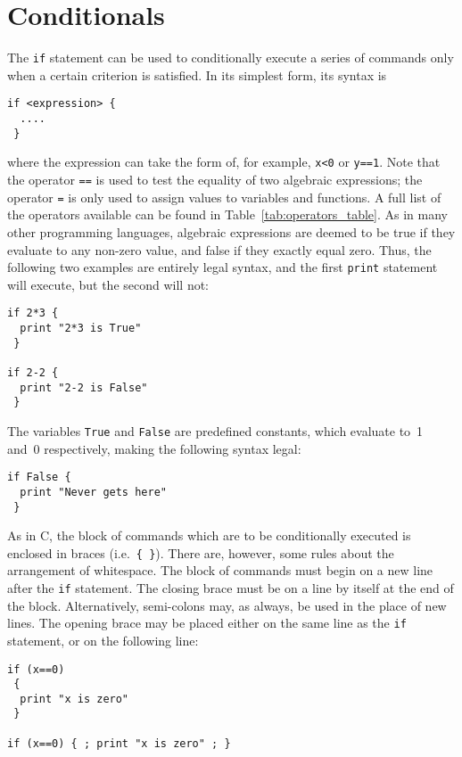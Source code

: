 \section{Conditionals}

The {\tt if} statement can be used to conditionally execute a series
of commands only when a certain criterion is satisfied. In its simplest form,
its syntax is

\begin{verbatim}
if <expression> {
  ....
 }
\end{verbatim}

\noindent where the expression can take the form of, for example, {\tt x<0} or
{\tt y==1}. Note that the operator {\tt ==} is used to test the equality of two
algebraic expressions; the operator {\tt =} is only used to assign values to
variables and functions. A full list of the operators available can be found in
Table~\ref{tab:operators_table}. As in many other programming languages,
algebraic expressions are deemed to be true if they evaluate to any non-zero
value, and false if they exactly equal zero. Thus, the following two examples
are entirely legal syntax, and the first {\tt print} statement will execute,
but the second will not:

\begin{verbatim}
if 2*3 {
  print "2*3 is True"
 }

if 2-2 {
  print "2-2 is False"
 }
\end{verbatim}

\noindent The variables {\tt True} and {\tt False} are predefined constants,
which evaluate to~1 and~0 respectively, making the following syntax legal:

\begin{verbatim}
if False {
  print "Never gets here"
 }
\end{verbatim}

As in C, the block of commands which are to be conditionally executed is
enclosed in braces (i.e.\ {\tt \{~\}}).  There are, however, some rules about
the arrangement of whitespace.  The block of commands must begin on a new line
after the {\tt if} statement. The closing brace must be on a line by itself at
the end of the block. Alternatively, semi-colons may, as always, be used in the
place of new lines. The opening brace may be placed either on the same line as
the {\tt if} statement, or on the following line:

\begin{verbatim}
if (x==0)
 {
  print "x is zero"
 }

if (x==0) { ; print "x is zero" ; }
\end{verbatim}

